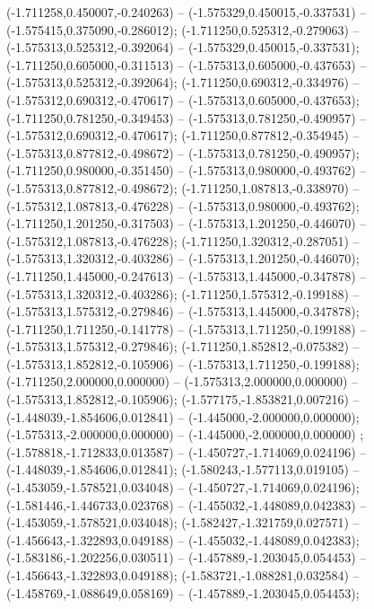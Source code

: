  (-1.711258,0.450007,-0.240263) -- (-1.575329,0.450015,-0.337531) -- (-1.575415,0.375090,-0.286012);
 (-1.711250,0.525312,-0.279063) -- (-1.575313,0.525312,-0.392064) -- (-1.575329,0.450015,-0.337531);
 (-1.711250,0.605000,-0.311513) -- (-1.575313,0.605000,-0.437653) -- (-1.575313,0.525312,-0.392064);
 (-1.711250,0.690312,-0.334976) -- (-1.575312,0.690312,-0.470617) -- (-1.575313,0.605000,-0.437653);
 (-1.711250,0.781250,-0.349453) -- (-1.575313,0.781250,-0.490957) -- (-1.575312,0.690312,-0.470617);
 (-1.711250,0.877812,-0.354945) -- (-1.575313,0.877812,-0.498672) -- (-1.575313,0.781250,-0.490957);
 (-1.711250,0.980000,-0.351450) -- (-1.575313,0.980000,-0.493762) -- (-1.575313,0.877812,-0.498672);
 (-1.711250,1.087813,-0.338970) -- (-1.575312,1.087813,-0.476228) -- (-1.575313,0.980000,-0.493762);
 (-1.711250,1.201250,-0.317503) -- (-1.575313,1.201250,-0.446070) -- (-1.575312,1.087813,-0.476228);
 (-1.711250,1.320312,-0.287051) -- (-1.575313,1.320312,-0.403286) -- (-1.575313,1.201250,-0.446070);
 (-1.711250,1.445000,-0.247613) -- (-1.575313,1.445000,-0.347878) -- (-1.575313,1.320312,-0.403286);
 (-1.711250,1.575312,-0.199188) -- (-1.575313,1.575312,-0.279846) -- (-1.575313,1.445000,-0.347878);
 (-1.711250,1.711250,-0.141778) -- (-1.575313,1.711250,-0.199188) -- (-1.575313,1.575312,-0.279846);
 (-1.711250,1.852812,-0.075382) -- (-1.575313,1.852812,-0.105906) -- (-1.575313,1.711250,-0.199188);
 (-1.711250,2.000000,0.000000) -- (-1.575313,2.000000,0.000000) -- (-1.575313,1.852812,-0.105906);
 (-1.577175,-1.853821,0.007216) -- (-1.448039,-1.854606,0.012841) -- (-1.445000,-2.000000,0.000000);
 (-1.575313,-2.000000,0.000000) -- (-1.445000,-2.000000,0.000000) ;
 (-1.578818,-1.712833,0.013587) -- (-1.450727,-1.714069,0.024196) -- (-1.448039,-1.854606,0.012841);
 (-1.580243,-1.577113,0.019105) -- (-1.453059,-1.578521,0.034048) -- (-1.450727,-1.714069,0.024196);
 (-1.581446,-1.446733,0.023768) -- (-1.455032,-1.448089,0.042383) -- (-1.453059,-1.578521,0.034048);
 (-1.582427,-1.321759,0.027571) -- (-1.456643,-1.322893,0.049188) -- (-1.455032,-1.448089,0.042383);
 (-1.583186,-1.202256,0.030511) -- (-1.457889,-1.203045,0.054453) -- (-1.456643,-1.322893,0.049188);
 (-1.583721,-1.088281,0.032584) -- (-1.458769,-1.088649,0.058169) -- (-1.457889,-1.203045,0.054453);
